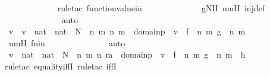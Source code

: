 \begin{isabellebody}
\ \ \ \ \ \ \ \ \ \ \ \ \isamarkupfalse%
{\isacharparenleft}{\kern0pt}rule{\isacharunderscore}{\kern0pt}tac\ function{\isacharunderscore}{\kern0pt}value{\isacharunderscore}{\kern0pt}in{\isacharparenright}{\kern0pt}\isanewline
\ \ \ \ \ \ \ \ \ \ \ \ \isamarkupfalse%
\ gNH\ nmH\ inj{\isacharunderscore}{\kern0pt}def\isanewline
\ \ \ \ \ \ \ \ \ \ \ \ \isamarkupfalse%
\ auto\isanewline
\ \ \ \ \ \ \ \ \ \ \isamarkupfalse%
\ \isamarkupfalse%
\ {\isachardoublequoteopen}v\ {\isasymin}\ {\isacharbraceleft}{\kern0pt}v\ {\isasymin}\ {\isacharparenleft}{\kern0pt}nat\ {\isasymtimes}\ nat{\isacharparenright}{\kern0pt}\ {\isasymtimes}\ N\ {\isachardot}{\kern0pt}\ {\isasymexists}n\ m{\isachardot}{\kern0pt}\ {\isasymlangle}n{\isacharcomma}{\kern0pt}\ m{\isasymrangle}\ {\isasymin}\ domain{\isacharparenleft}{\kern0pt}p{\isacharparenright}{\kern0pt}\ {\isasymand}\ v\ {\isacharequal}{\kern0pt}\ {\isasymlangle}{\isasymlangle}f\ {\isacharbackquote}{\kern0pt}\ n{\isacharcomma}{\kern0pt}\ m{\isasymrangle}{\isacharcomma}{\kern0pt}\ g\ {\isacharbackquote}{\kern0pt}\ {\isasymlangle}n{\isacharcomma}{\kern0pt}\ m{\isasymrangle}{\isasymrangle}{\isacharbraceright}{\kern0pt}{\isachardoublequoteclose}\ \isanewline
\ \ \ \ \ \ \ \ \ \ \ \ \isamarkupfalse%
\ nmH\ fnin\ \isanewline
\ \ \ \ \ \ \ \ \ \ \ \ \isamarkupfalse%
\ auto\isanewline
\ \ \ \ \ \ \ \ \isamarkupfalse%
\isanewline
\ \ \ \ \ \ \ \ \isamarkupfalse%
\ {\isachardoublequoteopen}{\isacharbraceleft}{\kern0pt}v\ {\isasymin}\ {\isacharparenleft}{\kern0pt}nat\ {\isasymtimes}\ nat{\isacharparenright}{\kern0pt}\ {\isasymtimes}\ N\ {\isachardot}{\kern0pt}\ {\isasymexists}n\ m{\isachardot}{\kern0pt}\ {\isasymlangle}n{\isacharcomma}{\kern0pt}\ m{\isasymrangle}\ {\isasymin}\ domain{\isacharparenleft}{\kern0pt}p{\isacharparenright}{\kern0pt}\ {\isasymand}\ v\ {\isacharequal}{\kern0pt}\ {\isasymlangle}{\isasymlangle}f\ {\isacharbackquote}{\kern0pt}\ n{\isacharcomma}{\kern0pt}\ m{\isasymrangle}{\isacharcomma}{\kern0pt}\ g\ {\isacharbackquote}{\kern0pt}\ {\isasymlangle}n{\isacharcomma}{\kern0pt}\ m{\isasymrangle}{\isasymrangle}{\isacharbraceright}{\kern0pt}\ {\isacharequal}{\kern0pt}\ h{\isachardoublequoteclose}\ \isanewline
\ \ \ \ \ \ \ \ \ \ \isamarkupfalse%
{\isacharparenleft}{\kern0pt}rule{\isacharunderscore}{\kern0pt}tac\ equality{\isacharunderscore}{\kern0pt}iffI{\isacharcomma}{\kern0pt}\ rule{\isacharunderscore}{\kern0pt}tac\ iffI{\isacharparenright}{\kern0pt}\isanewline

\end{isabellebody}
